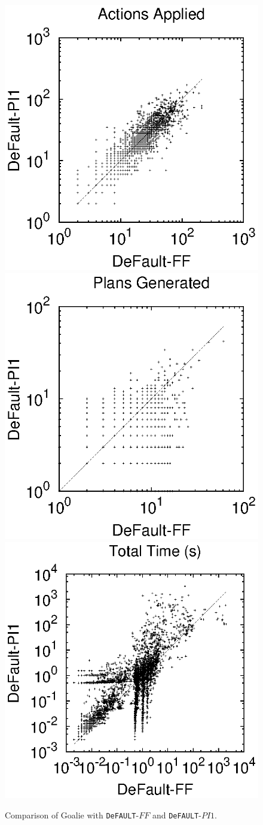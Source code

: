 \documentclass{article}
\def\FFRISKY{{\tt DeFAULT}}
\begin{document}
  
\begin{figure}[t]    
\hspace*{-1cm}
\includegraphics[width=.42\linewidth]{./hobonavSteps.eps}\hspace*{-1.5cm}
\includegraphics[width=.42\linewidth]{./hobonavPlans.eps}\hspace*{-1.5cm}
\includegraphics[width=.42\linewidth]{./hobonavTime.eps} 
\caption{\label{fig:exec} Comparison of Goalie with \FFRISKY-$FF$ and
\FFRISKY-$PI1$.}
\end{figure}		   
\end{document}
